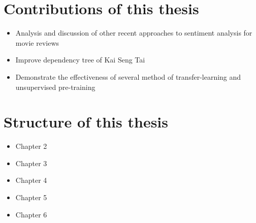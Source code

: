 \section{Contributions of this thesis}
\begin{itemize}
\item Analysis and discussion of other recent approaches to sentiment analysis for movie reviews 
\item Improve dependency tree of Kai Seng Tai
\item Demonstrate the effectiveness of several method of transfer-learning and unsupervised pre-training  
\end{itemize}

\section{Structure of this thesis}
\begin{itemize}
\item Chapter 2
\item Chapter 3
\item Chapter 4
\item Chapter 5
\item Chapter 6
\end{itemize}